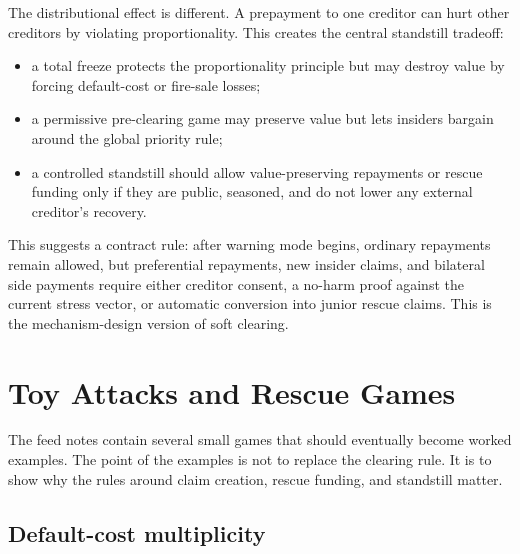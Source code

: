 \documentclass[11pt,oneside]{article}
\begin{document}
The distributional effect is different. A prepayment to one creditor can hurt
other creditors by violating proportionality. This creates the central
standstill tradeoff:

\begin{itemize}[leftmargin=1.5em]
  \item a total freeze protects the proportionality principle but may destroy
  value by forcing default-cost or fire-sale losses;
  \item a permissive pre-clearing game may preserve value but lets insiders
  bargain around the global priority rule;
  \item a controlled standstill should allow value-preserving repayments or
  rescue funding only if they are public, seasoned, and do not lower any
  external creditor's recovery.
\end{itemize}

This suggests a contract rule: after warning mode begins, ordinary repayments
remain allowed, but preferential repayments, new insider claims, and bilateral
side payments require either creditor consent, a no-harm proof against the
current stress vector, or automatic conversion into junior rescue claims. This
is the mechanism-design version of soft clearing.

\section{Toy Attacks and Rescue Games}

The feed notes contain several small games that should eventually become
worked examples. The point of the examples is not to replace the clearing rule.
It is to show why the rules around claim creation, rescue funding, and
standstill matter.

\subsection{Default-cost multiplicity}
\end{document}
